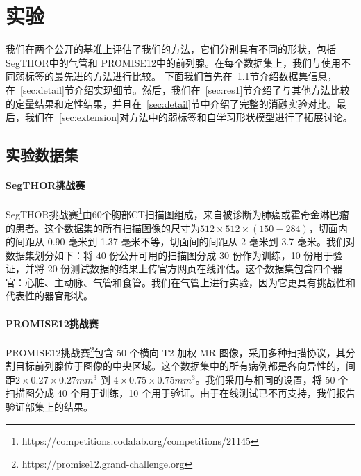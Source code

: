\section{实验}
我们在两个公开的基准上评估了我们的方法，它们分别具有不同的形状，包括 SegTHOR\citep{trullo2019multiorgan}中的气管和 PROMISE12\citep{Litjens2014EvaluationOP}中的前列腺。在每个数据集上，我们与使用不同弱标签的最先进的方法进行比较。
下面我们首先在~\ref{sec:dataset}节介绍数据集信息，在~\ref{sec:detail}节介绍实现细节。然后，我们在~\ref{sec:res1}节介绍了与其他方法比较的定量结果和定性结果，并且在~\ref{sec:detail}节中介绍了完整的消融实验对比。最后，我们在~\ref{sec:extension}对方法中的弱标签和自学习形状模型进行了拓展讨论。

\subsection{实验数据集} \label{sec:dataset}

\paragraph{SegTHOR挑战赛}
SegTHOR挑战赛\footnote{https://competitions.codalab.org/competitions/21145}\citep{trullo2019multiorgan}由60个胸部CT扫描图组成，来自被诊断为肺癌或霍奇金淋巴瘤的患者。这个数据集的所有扫描图像的尺寸为$512\times512\times(150-284)$，切面内的间距从 0.90 毫米到 1.37 毫米不等，切面间的间距从 2 毫米到 3.7 毫米。我们对数据集划分如下：将 40 份公开可用的扫描图分成 30 份作为训练，10 份用于验证，并将 20 份测试数据的结果上传官方网页在线评估。这个数据集包含四个器官：心脏、主动脉、气管和食管。我们在气管上进行实验，因为它更具有挑战性和代表性的器官形状。


\paragraph{PROMISE12挑战赛}
PROMISE12挑战赛\footnote{https://promise12.grand-challenge.org}\citep{Litjens2014EvaluationOP}包含 50 个横向 T2 加权 MR 图像，采用多种扫描协议，其分割目标前列腺位于图像的中央区域。这个数据集中的所有病例都是各向异性的，间距$2\times0.27\times0.27 mm^{3}$ 到 $4\times0.75\times0.75 mm^{3}$。我们采用与\citet{kervadec2020bounding}相同的设置，将 50 个扫描图分成 40 个用于训练，10 个用于验证。由于在线测试已不再支持，我们报告验证部集上的结果。

